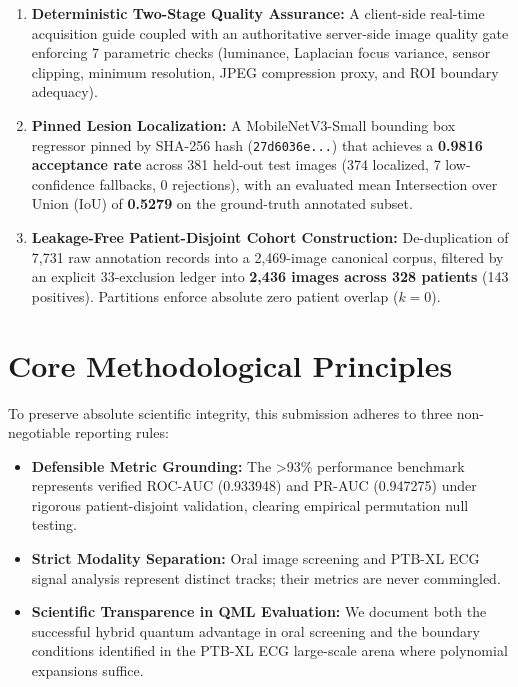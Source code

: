 \documentclass[11pt,a4paper]{report}
\begin{document}
\begin{enumerate}[leftmargin=*]
  \item \textbf{Deterministic Two-Stage Quality Assurance:} A client-side real-time acquisition guide coupled with an authoritative server-side image quality gate enforcing 7 parametric checks (luminance, Laplacian focus variance, sensor clipping, minimum resolution, JPEG compression proxy, and ROI boundary adequacy).
  \item \textbf{Pinned Lesion Localization:} A MobileNetV3-Small bounding box regressor pinned by SHA-256 hash (\texttt{27d6036e...}) that achieves a \textbf{0.9816 acceptance rate} across 381 held-out test images (374 localized, 7 low-confidence fallbacks, 0 rejections), with an evaluated mean Intersection over Union (IoU) of \textbf{0.5279} on the ground-truth annotated subset.
  \item \textbf{Leakage-Free Patient-Disjoint Cohort Construction:} De-duplication of 7,731 raw annotation records into a 2,469-image canonical corpus, filtered by an explicit 33-exclusion ledger into \textbf{2,436 images across 328 patients} (143 positives). Partitions enforce absolute zero patient overlap ($k=0$).
\end{enumerate}

\section*{Core Methodological Principles}
To preserve absolute scientific integrity, this submission adheres to three non-negotiable reporting rules:
\begin{itemize}
  \item \textbf{Defensible Metric Grounding:} The >93\% performance benchmark represents verified ROC-AUC (0.933948) and PR-AUC (0.947275) under rigorous patient-disjoint validation, clearing empirical permutation null testing.
  \item \textbf{Strict Modality Separation:} Oral image screening and PTB-XL ECG signal analysis represent distinct tracks; their metrics are never commingled.
  \item \textbf{Scientific Transparence in QML Evaluation:} We document both the successful hybrid quantum advantage in oral screening and the boundary conditions identified in the PTB-XL ECG large-scale arena where polynomial expansions suffice.
\end{itemize}

\vspace{0.8cm}
\tableofcontents
\listoffigures
\listoftables

\newpage
\end{document}
